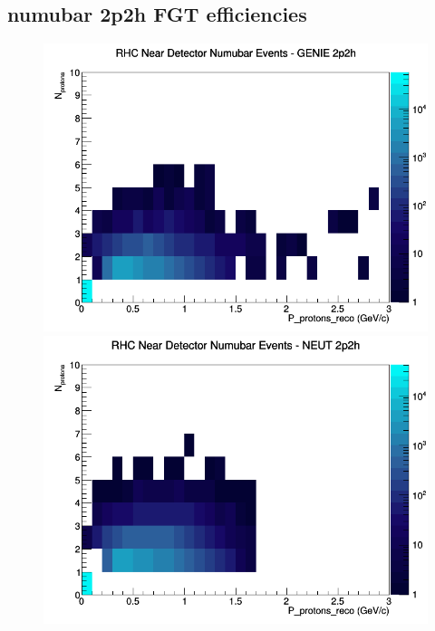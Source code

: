 \subsection{numubar 2p2h FGT efficiencies}
\begin{figure}[h]
\includegraphics[width=\linewidth]{eff_N_P/FGT/protons/2p2h_RHC_ND_numubar_N_P_GENIE.png}
\endminipage
{}
\includegraphics[width=\linewidth]{eff_N_P/FGT/protons/2p2h_RHC_ND_numubar_N_P_NEUT.png}
\endminipage
{}

\end{figure}
